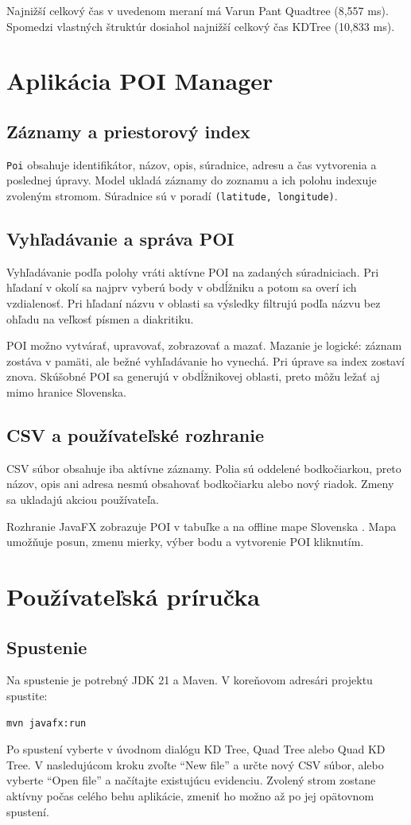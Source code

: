 \documentclass[12pt,a4paper,oneside]{report}
\begin{document}
Najnižší celkový čas v uvedenom meraní má Varun Pant Quadtree
(8,557 ms). Spomedzi vlastných štruktúr dosiahol najnižší celkový čas
KDTree (10,833 ms).

\chapter{Aplikácia POI Manager}
\label{chap:poi}

\section{Záznamy a priestorový index}
\texttt{Poi} obsahuje identifikátor, názov, opis, súradnice, adresu
a čas vytvorenia a poslednej úpravy. Model ukladá záznamy do zoznamu
a ich polohu indexuje zvoleným stromom. Súradnice sú v poradí
\texttt{(latitude, longitude)}.

\section{Vyhľadávanie a správa POI}
Vyhľadávanie podľa polohy vráti aktívne POI na zadaných súradniciach.
Pri hľadaní v okolí sa najprv vyberú body v obdĺžniku a potom sa overí
ich vzdialenosť. Pri hľadaní názvu v oblasti sa výsledky filtrujú podľa
názvu bez ohľadu na veľkosť písmen a diakritiku.

POI možno vytvárať, upravovať, zobrazovať a mazať. Mazanie je logické:
záznam zostáva v pamäti, ale bežné vyhľadávanie ho vynechá. Pri úprave
sa index zostaví znova. Skúšobné POI sa generujú v obdĺžnikovej oblasti,
preto môžu ležať aj mimo hranice Slovenska.

\section{CSV a používateľské rozhranie}
CSV súbor obsahuje iba aktívne záznamy. Polia sú oddelené bodkočiarkou,
preto názov, opis ani adresa nesmú obsahovať bodkočiarku alebo nový riadok.
Zmeny sa ukladajú akciou používateľa.

Rozhranie JavaFX zobrazuje POI v tabuľke a na offline mape Slovenska
\cite{naturalEarth}. Mapa umožňuje posun, zmenu mierky, výber bodu
a vytvorenie POI kliknutím.

\chapter{Používateľská príručka}

\section{Spustenie}
Na spustenie je potrebný JDK 21 a Maven. V koreňovom adresári projektu
spustite:
\begin{verbatim}
mvn javafx:run
\end{verbatim}
Po spustení vyberte v úvodnom dialógu KD Tree, Quad Tree alebo Quad KD
Tree. V nasledujúcom kroku zvoľte \enquote{New file} a určte nový CSV
súbor, alebo vyberte \enquote{Open file} a načítajte existujúcu
evidenciu. Zvolený strom zostane aktívny počas celého behu aplikácie,
zmeniť ho možno až po jej opätovnom spustení.
\end{document}
